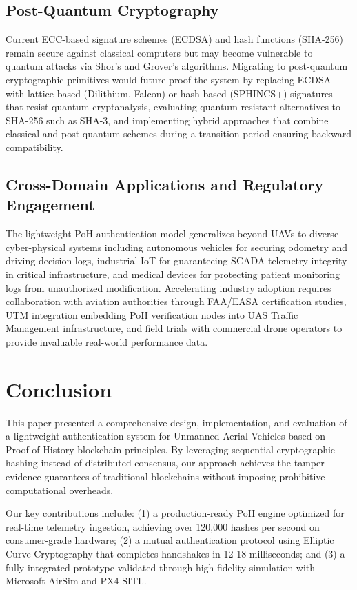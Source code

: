 \documentclass[preprint,12pt]{elsarticle}
\begin{document}
\subsection{Post-Quantum Cryptography}

Current ECC-based signature schemes (ECDSA) and hash functions (SHA-256) remain secure against classical computers but may become vulnerable to quantum attacks via Shor's and Grover's algorithms. Migrating to post-quantum cryptographic primitives would future-proof the system by replacing ECDSA with lattice-based (Dilithium, Falcon) or hash-based (SPHINCS+) signatures that resist quantum cryptanalysis, evaluating quantum-resistant alternatives to SHA-256 such as SHA-3, and implementing hybrid approaches that combine classical and post-quantum schemes during a transition period ensuring backward compatibility.

\subsection{Cross-Domain Applications and Regulatory Engagement}

The lightweight PoH authentication model generalizes beyond UAVs to diverse cyber-physical systems including autonomous vehicles for securing odometry and driving decision logs, industrial IoT for guaranteeing SCADA telemetry integrity in critical infrastructure, and medical devices for protecting patient monitoring logs from unauthorized modification. Accelerating industry adoption requires collaboration with aviation authorities through FAA/EASA certification studies, UTM integration embedding PoH verification nodes into UAS Traffic Management infrastructure, and field trials with commercial drone operators to provide invaluable real-world performance data.

\section{Conclusion}

This paper presented a comprehensive design, implementation, and evaluation of a lightweight authentication system for Unmanned Aerial Vehicles based on Proof-of-History blockchain principles. By leveraging sequential cryptographic hashing instead of distributed consensus, our approach achieves the tamper-evidence guarantees of traditional blockchains without imposing prohibitive computational overheads.

Our key contributions include: (1) a production-ready PoH engine optimized for real-time telemetry ingestion, achieving over 120,000 hashes per second on consumer-grade hardware; (2) a mutual authentication protocol using Elliptic Curve Cryptography that completes handshakes in 12-18 milliseconds; and (3) a fully integrated prototype validated through high-fidelity simulation with Microsoft AirSim and PX4 SITL.
\end{document}

